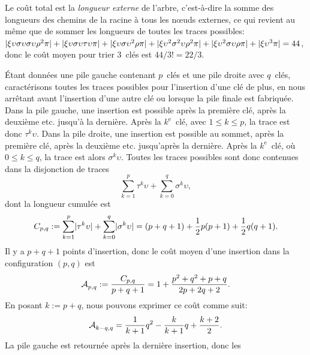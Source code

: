 Le coût total est la \emph{longueur externe}\label{external_path_length} de l'arbre,
c'est-à-dire la somme des longueurs des chemins de la racine à tous
les nœuds externes, ce qui revient au même que de sommer les longueurs
de toutes les traces possibles:
\(\lvert{\xi\upsilon\sigma\upsilon\sigma\upsilon\rho^2\pi}\rvert{} +
\lvert{\xi\upsilon\sigma\upsilon\tau\upsilon\pi}\rvert{} +
\lvert{\xi\upsilon\sigma\upsilon^2\rho\pi}\rvert{} +
\lvert{\xi\upsilon^2\sigma^2\upsilon\rho^2\pi}\rvert{} +
\lvert{\xi\upsilon^2\sigma\upsilon\rho\pi}\rvert{} + \lvert{\xi\upsilon^3\pi}\rvert{} =
44\), donc le coût moyen pour trier \(3\)~clés est \(44/3! = 22/3\).

Étant données une pile gauche contenant \(p\)~clés et une pile droite
avec \(q\)~clés, caractérisons toutes les traces possibles pour
l'insertion d'une clé de plus, en nous arrêtant avant l'insertion
d'une autre clé ou lorsque la pile finale est fabriquée. Dans la pile
gauche, une insertion est possible après la première clé, après la
deuxième etc. jusqu'à la dernière. Après la \(k^\text{e}\)~clé, avec
\(1 \leqslant k \leqslant p\), la trace est donc
\(\tau^k\upsilon\). Dans la pile droite, une insertion est possible au
sommet, après la première clé, après la deuxième etc. jusqu'après la
dernière. Après la \(k^\text{e}\)~clé, où \(0 \leqslant k \leqslant
q\), la trace est alors \(\sigma^k\upsilon\). Toutes les traces
possibles sont donc contenues dans la disjonction de traces
\begin{equation*}
\sum_{k=1}^{p}{\tau^k\upsilon} + \sum_{k=0}^{q}{\sigma^k\upsilon},
\end{equation*}
dont la longueur cumulée est
\begin{equation*}
C_{p,q} := \sum_{k=1}^{p}\lvert{\tau^k\upsilon}\rvert{} +
\sum_{k=0}^{q}\lvert{\sigma^k\upsilon}\rvert{}
= (p+q+1) + \frac{1}{2}p(p+1) + \frac{1}{2}q(q+1).
\end{equation*}
Il y a \(p+q+1\) points d'insertion, donc le coût moyen d'une
insertion dans la configuration \((p,q)\) est
\begin{equation}
\mathcal{A}_{p,q}^{} := \frac{C_{p,q}}{p+q+1}
           = 1 + \frac{p^2 + q^2 + p + q}{2p + 2q + 2}.
\label{eq:Mpq}
\end{equation}
En posant \(k := p + q\), nous pouvons exprimer ce coût comme suit:
\begin{equation*}
\mathcal{A}_{k-q,q}^{} = \frac{1}{k+1}{q^2} - \frac{k}{k+1}{q} + \frac{k+2}{2}.
\end{equation*}
La pile gauche est retournée après la dernière insertion, donc les
